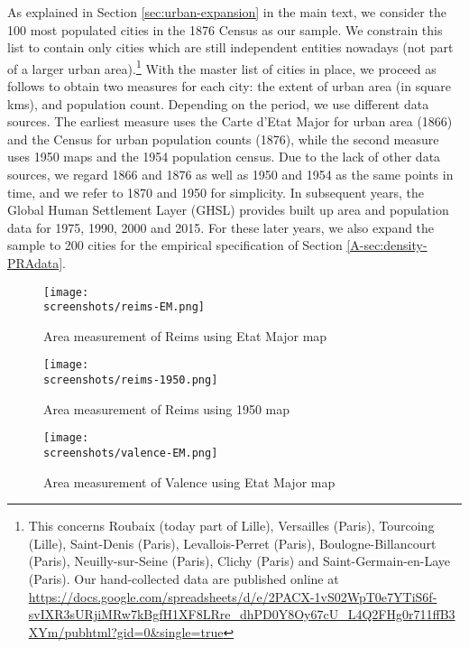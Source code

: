 \documentclass[11pt]{report}
\newcommand{\datatables}{../../output/data/tables}
\newcommand{\screenshots}{../../data/present-screenshots}
\begin{document}
As explained in Section \ref{sec:urban-expansion} in the main text, we consider the 100 most populated cities in the 1876 Census as our sample. We constrain this list to contain only cities which are still independent entities nowadays (not part of a larger urban area).\footnote{This concerns Roubaix (today part of Lille), Versailles (Paris), Tourcoing (Lille), Saint-Denis (Paris), Levallois-Perret (Paris), Boulogne-Billancourt (Paris), Neuilly-sur-Seine (Paris), Clichy (Paris) and Saint-Germain-en-Laye (Paris). Our hand-collected data are published online at \url{https://docs.google.com/spreadsheets/d/e/2PACX-1vS02WpT0e7YTiS6f-svIXR3sURjiMRw7kBgfH1XF8LRre_dhPD0Y8Oy67cU_L4Q2FHg0r711ffB3XYm/pubhtml?gid=0&single=true}} 
With the master list of cities in place, we proceed as follows to obtain two measures for each city: the extent of urban area (in square kms), and population count. Depending on the period, we use different data sources. The earliest measure uses the Carte d'Etat Major for urban area (1866) and the Census for urban population counts (1876), while the second measure uses 1950 maps and the 1954 population census. Due to the lack of other data sources, we regard 1866 and 1876 as well as 1950 and 1954 as the same points in time, and we refer to 1870 and 1950 for simplicity. In subsequent years, the Global Human Settlement Layer (GHSL) provides built up area and population data for 1975, 1990, 2000 and 2015. For these later years, we also expand the sample to 200 cities for the empirical specification of Section \ref{A-sec:density-PRAdata}. 


% 

\begin{figure}[p]
	\centering
	\texttt{[image: \\screenshots/reims-EM.png]}
	\caption{Area measurement of Reims using Etat Major map\label{A-fig:Reims-EM}}
\end{figure}


\begin{figure}[p]
	\centering
	\texttt{[image: \\screenshots/reims-1950.png]}
	\caption{Area measurement of Reims using 1950 map\label{A-fig:Reims-1950}}
\end{figure}




\begin{figure}[p]
	\centering
	\texttt{[image: \\screenshots/valence-EM.png]}
	\caption{Area measurement of Valence using Etat Major map\label{A-fig:valence-EM}}
\end{figure}
\end{document}
